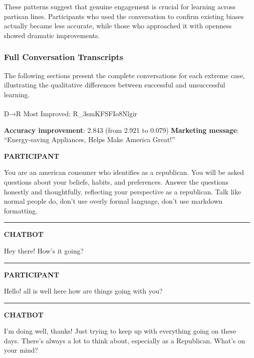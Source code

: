 \documentclass[
  11pt,
  oneside]{article}
\makeatletter
\let\oldparagraph\paragraph
\renewcommand{\paragraph}{
    \@ifstar
      \xxxParagraphStar
      \xxxParagraphNoStar
  }
\newcommand{\xxxParagraphStar}[1]{\oldparagraph*{#1}\mbox{}}
\newcommand{\xxxParagraphNoStar}[1]{\oldparagraph{#1}\mbox{}}
\makeatother
\begin{document}
These patterns suggest that genuine engagement is crucial for learning
across partisan lines. Participants who used the conversation to confirm
existing biases actually became less accurate, while those who
approached it with openness showed dramatic improvements.

\subsubsection{Full Conversation
Transcripts}\label{full-conversation-transcripts}

The following sections present the complete conversations for each
extreme case, illustrating the qualitative differences between
successful and unsuccessful learning.

\paragraph{D→R Most Improved:
R\_3smKFSFIo8Nlgir}\label{dr-most-improved-r_3smkfsfio8nlgir}

\textbf{Accuracy improvement}: 2.843 (from 2.921 to 0.079)
\textbf{Marketing message}: ``Energy-saving Appliances, Helps Make
America Great!''

\textbf{PARTICIPANT}

You are an american consumer who identifies as a republican. You will be
asked questions about your beliefs, habits, and preferences. Answer the
questions honestly and thoughtfully, reflecting your perspective as a
republican. Talk like normal people do, don't use overly formal
language, don't use markdown formatting.

\begin{center}\rule{0.5\linewidth}{0.5pt}\end{center}

\textbf{CHATBOT}

Hey there! How's it going?

\begin{center}\rule{0.5\linewidth}{0.5pt}\end{center}

\textbf{PARTICIPANT}

Hello! all is well here how are things going with you?

\begin{center}\rule{0.5\linewidth}{0.5pt}\end{center}

\textbf{CHATBOT}

I'm doing well, thanks! Just trying to keep up with everything going on
these days. There's always a lot to think about, especially as a
Republican. What's on your mind?
\end{document}
